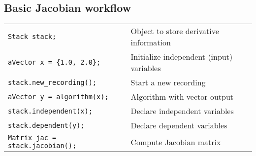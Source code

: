 \documentclass[10pt,a4,landscape]{article}
\def\code#1{\texttt{#1}}
\begin{document}
\subsection*{Basic Jacobian workflow}
\begin{tabular}{ll}
\code{Stack stack;} & Object to store derivative information\\
\code{aVector x = \{1.0, 2.0\};} & Initialize independent (input) variables\\
\code{stack.new\_recording();} & Start a new recording\\
\code{aVector y = algorithm(x);} & Algorithm with vector output\\
\code{stack.independent(x);} & Declare independent variables \\
\code{stack.dependent(y);} & Declare dependent variables\\
\code{Matrix jac = stack.jacobian();} & Compute Jacobian matrix\\
\end{tabular}
\end{document}
